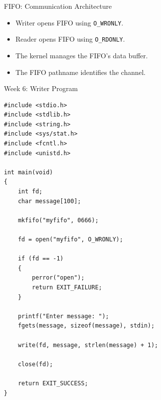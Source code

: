 \documentclass[aspectratio=169,10pt]{beamer}
\begin{document}
\begin{frame}{FIFO: Communication Architecture}

\begin{center}
\end{center}

\vspace{0.5cm}

\begin{itemize}
    \item Writer opens FIFO using \texttt{O\_WRONLY}.
    \item Reader opens FIFO using \texttt{O\_RDONLY}.
    \item The kernel manages the FIFO's data buffer.
    \item The FIFO pathname identifies the channel.
\end{itemize}

\end{frame}

\begin{frame}[fragile]{Week 6: Writer Program}

\begin{lstlisting}[style=cstyle]
#include <stdio.h>
#include <stdlib.h>
#include <string.h>
#include <sys/stat.h>
#include <fcntl.h>
#include <unistd.h>

int main(void)
{
    int fd;
    char message[100];

    mkfifo("myfifo", 0666);

    fd = open("myfifo", O_WRONLY);

    if (fd == -1)
    {
        perror("open");
        return EXIT_FAILURE;
    }

    printf("Enter message: ");
    fgets(message, sizeof(message), stdin);

    write(fd, message, strlen(message) + 1);

    close(fd);

    return EXIT_SUCCESS;
}
\end{lstlisting}

\end{frame}
\end{document}
